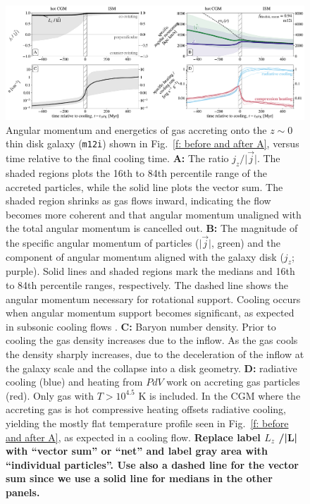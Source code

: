 \documentclass[fleqn,usenatbib]{mnras}
\begin{document}
\begin{figure}
\includegraphics[width=\textwidth]{figures/before_and_after/before_and_after_m12i_md.pdf}
\caption{
Angular momentum and energetics of gas accreting onto the $z\sim0$ thin disk galaxy (\texttt{m12i}) shown in Fig.~\ref{f: before and after A}, versus time relative to the final cooling time.
\textbf{A:}
The ratio $j_z / \vert \vec j \vert$.
The shaded regions plots the 16th to 84th percentile range of the accreted particles, while the solid line plots the vector sum.
The shaded region shrinks as gas flows inward, indicating the flow becomes more coherent and that angular momentum unaligned with the total angular momentum is cancelled out. 
\textbf{B:}
The magnitude of the specific angular momentum of particles ($\vert\vec{j}\vert$, green) and the component of angular momentum aligned with the galaxy disk ($j_z$; purple).
Solid lines and shaded regions mark the medians and 16th to 84th percentile ranges, respectively. 
The dashed line shows the angular momentum necessary for rotational support.
Cooling occurs when angular momentum support becomes significant, as expected in subsonic cooling flows \citep{Cowie1980, Stern2020}.
\textbf{C:}
Baryon number density.
Prior to cooling the gas density increases due to the inflow.
As the gas cools the density sharply increases, due to the deceleration of the inflow at the galaxy scale and the collapse into a disk geometry. 
\textbf{D:}
radiative cooling (blue) and heating from $PdV$ work on accreting gas particles (red).
Only gas with $T>10^{4.5}$ K is included. 
In the CGM where the accreting gas is hot compressive heating offsets radiative cooling, yielding the mostly flat temperature profile seen in Fig.~\ref{f: before and after A}, as expected in a cooling flow.
\textbf{Replace label $L_z$ /|L| with “vector sum” or “net” and label gray area with “individual particles”.
Use also a dashed line for the vector sum since we use a solid line for medians in the other panels.}
}
\label{f: before and after B}
\end{figure}
\end{document}
